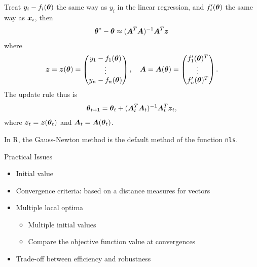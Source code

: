 \begin{frame}
  Treat $y_i - f_i(\boldsymbol{\theta})$ the same way as
  $y_i$ in the linear regression, and $f_i'(\boldsymbol{\theta})$ the same way
  as $\boldsymbol{x}_i$, then
  \begin{align*}
    \boldsymbol{\theta}^* - \boldsymbol{\theta} \approx
    (\boldsymbol{A}\sp{T}\boldsymbol{A})^{-1} \boldsymbol{A}\sp{T} \boldsymbol{z}
  \end{align*}
  where
  \begin{gather*}
    \boldsymbol{z} = \boldsymbol{z}(\boldsymbol{\theta})=
    \begin{pmatrix}
      y_1 - f_1(\boldsymbol{\theta}) \\\vdots\\ y_n - f_n(\boldsymbol{\theta})
    \end{pmatrix},\quad
    \boldsymbol{A} = \boldsymbol{A}(\boldsymbol{\theta}) = \begin{pmatrix}
      f_1'(\boldsymbol{\theta})\sp{T}\\\vdots\\f_n'(\boldsymbol{\theta})\sp{T}
    \end{pmatrix}.
  \end{gather*}
  The update rule thus is
  \begin{align*}
    \boldsymbol{\theta}_{t+1} = \boldsymbol{\theta}_t + (\boldsymbol{A}_t\sp{T}\boldsymbol{A}_t)^{-1}
    \boldsymbol{A}_t\sp{T}\boldsymbol{z}_t,
  \end{align*}
  where $\boldsymbol{z}_t = \boldsymbol{z}(\boldsymbol{\theta}_t)$ and $\boldsymbol{A}_t = \boldsymbol{A}(\boldsymbol{\theta}_t)$.

  In R, the Gauss-Newton method is the default method of the function
  \texttt{nls}.
\end{frame}




\begin{frame}{Practical Issues}
\begin{itemize}
\item Initial value
\item Convergence criteria: based on a distance measures for vectors
\item Multiple local optima
  \begin{itemize}
  \item Multiple initial values
  \item Compare the objective function value at convergences
  \end{itemize}
\item Trade-off between efficiency and robustness
\end{itemize}
\end{frame}


